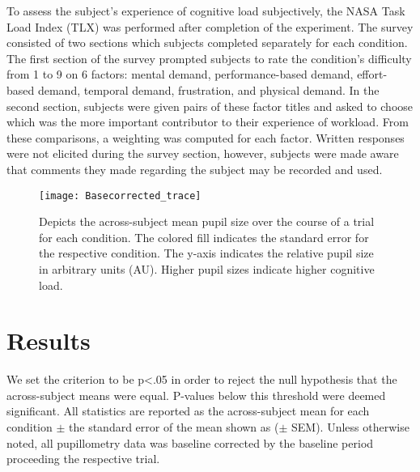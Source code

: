 \documentclass[10pt]{article}
\begin{document}
To assess the subject's experience of cognitive load subjectively,
the NASA Task Load Index (TLX) was performed after completion
of the experiment\cite{Zickler2013a}.  The survey consisted of two
sections which subjects completed separately for each
condition.  The first section of the survey prompted subjects
to rate the condition's difficulty from 1 to 9 on 6 factors:
mental demand, performance-based demand, effort-based demand,
temporal demand, frustration, and physical demand. In the
second section, subjects were given pairs of these factor
titles and asked to choose which was the more important
contributor to their experience of workload.  From these
comparisons, a weighting was computed for each factor.
Written responses were not elicited during the survey section,
however, subjects were made aware that comments they made
regarding the subject may be recorded and used.




\begin{figure}[t]
  \centering
  \texttt{[image: Basecorrected\_trace]}
  \caption{Depicts the across-subject mean pupil size over the course of a trial
  for each condition.  The colored fill indicates the standard error
  for the respective condition.  The y-axis indicates the
  relative pupil size in arbitrary units (AU). Higher pupil
  sizes indicate higher cognitive load.}
  \label{trialtrace}
\end{figure}

\section{Results}

We set the criterion to be p<.05 in order to reject the null
hypothesis that the across-subject means were equal. P-values
below this threshold were deemed significant. All statistics
are reported as the across-subject mean for each condition $\pm$
the standard error of the mean shown as ($\pm$ SEM).  Unless otherwise
noted, all pupillometry data was baseline corrected 
by the baseline period proceeding the respective trial.
\end{document}
